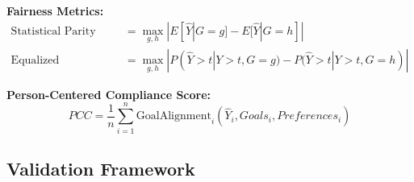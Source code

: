\textbf{Fairness Metrics:}
\begin{align}
\text{Statistical Parity} &= \max_{g,h} |E[\hat{Y}|G=g] - E[\hat{Y}|G=h]| \\
\text{Equalized Opportunity} &= \max_{g,h} |P(\hat{Y}>t|Y>t,G=g) - P(\hat{Y}>t|Y>t,G=h)|
\end{align}

\textbf{Person-Centered Compliance Score:}
\begin{equation}
PCC = \frac{1}{n}\sum_{i=1}^{n} \text{GoalAlignment}_i(\hat{Y}_i, Goals_i, Preferences_i)
\end{equation}

\subsection{Validation Framework}

